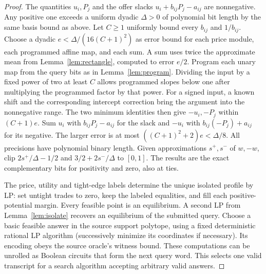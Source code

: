 \documentclass[11pt,oneside,openany,notitlepage]{report}
\begin{document}
\begin{proof}
The quantities \(u_i,P_j\) and the offer slacks
\(u_i+b_{ij}P_j-a_{ij}\) are nonnegative. Any positive one exceeds a
uniform dyadic \(\Delta>0\) of polynomial bit length by the same basis
bound as above. Let \(C\ge1\) uniformly bound every \(b_{ij}\) and \(1/b_{ij}\).
Choose a dyadic \(e<\Delta/(16(C+1)^2)\) as error bound for each price
module, each programmed affine map, and each sum. A sum uses twice the
approximate mean from Lemma~\ref{lem:rectangle}, computed to error \(e/2\).
Program each unary map from the query bits as in Lemma~\ref{lem:program}.
Dividing the input by a fixed power of two at least \(C\) allows
programmed slopes below one after multiplying the programmed factor by
that power. For a signed input, a known shift and the corresponding
intercept correction bring the argument into the nonnegative range.
The two minimum identities then give \(-u_i,-P_j\) within \((C+1)e\).
Sum \(u_i\) with \(b_{ij}P_j-a_{ij}\) for the slack and \(-u_i\) with
\(b_{ij}(-P_j)+a_{ij}\) for its negative. The larger error is at most
\(((C+1)^2+2)e<\Delta/8\). All precisions have polynomial binary length.
Given approximations
\(s^+,s^-\) of \(w,-w\), clip \(2s^+/\Delta-1/2\) and
\(3/2+2s^-/\Delta\) to \([0,1]\). The results are the exact complementary
bits for positivity and zero, also at ties.

The price, utility and tight-edge labels determine the unique isolated
profile by LP: set untight trades to zero, keep the labeled equalities,
and fill each positive-potential margin. Every feasible point is an
equilibrium. A second LP from Lemma~\ref{lem:isolate} recovers an
equilibrium of the submitted query. Choose a basic feasible answer
in the source support polytope, using a fixed deterministic rational LP
algorithm (successively minimize its coordinates if necessary). Its
encoding obeys the source oracle's witness bound. These computations can be unrolled
as Boolean circuits that form the next query word. This selects one valid
transcript for a search algorithm accepting arbitrary valid answers.


\end{proof}
\end{document}
